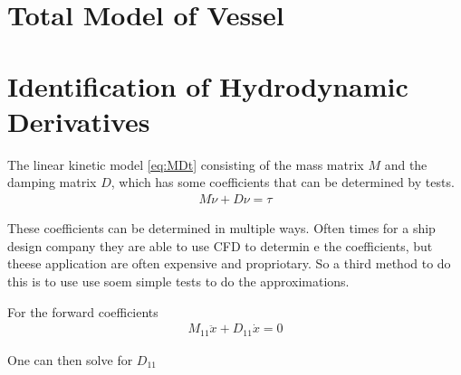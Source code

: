 \section{Total Model of Vessel}

\section{Identification of Hydrodynamic Derivatives}
The linear kinetic model \eqref{eq:MDt} consisting of the mass matrix $M$ and the damping matrix $D$, which has some coefficients that can be determined by tests.
\begin{align}
M \dot \nu + D \nu = \tau
\label{eq:MDt}
\end{align}

These coefficients can be determined in multiple ways. Often times for a ship design company they are able to use \ac{CFD} to determin e the coefficients, but theese application are often expensive and propriotary. So a third method to do this is to use use soem simple tests to do the approximations.

For the forward coefficients
\begin{align}
M_{11} \ddot x + D_{11} \dot x = 0
\end{align}

One can then solve for $D_{11}$
 
